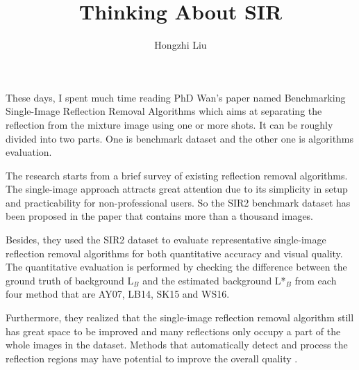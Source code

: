 \documentclass{article}
\author{Hongzhi Liu}
\title{Thinking About SIR}
\begin{document}
\maketitle
  \par
  These days, I spent much time reading PhD Wan's paper named Benchmarking Single-Image Reflection Removal Algorithms which aims at separating the reflection from the mixture image using one or more shots. It can be roughly divided into two parts. One is benchmark dataset and the other one is algorithms evaluation. 
  
  The research starts from a brief survey of existing reflection removal algorithms. The single-image approach attracts great attention due to its simplicity in setup and practicability for non-professional users. So the SIR2 benchmark dataset has been proposed in the paper that contains more than a thousand images. 
  
   Besides, they used the SIR2 dataset to evaluate representative single-image reflection removal algorithms for both quantitative accuracy and visual quality. The quantitative evaluation is performed by checking the difference between the ground truth of background L$_B$ and the estimated background L*$_B$ from each four method that are AY07, LB14, SK15 and WS16.
   
   Furthermore, they realized that the single-image reflection removal algorithm still has great space to be improved and many reflections only occupy a part of the whole images in the dataset. Methods that automatically detect and process the reflection regions may have potential to improve the overall quality \cite{Wan2017Benchmarking}.
   


\end{document}
